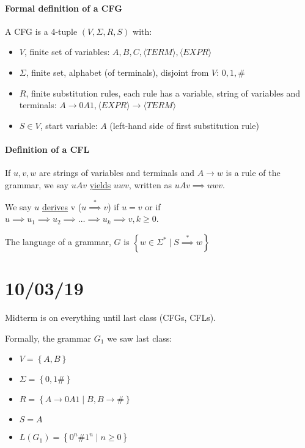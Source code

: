 \documentclass[12 pt]{article}
\begin{document}
\paragraph{Formal definition of a CFG}
A CFG is a 4-tuple $(V, \Sigma, R, S)$ with:
\begin{itemize}
\item $V$, finite set of variables: $A, B, C, \langle TERM \rangle, \langle EXPR
  \rangle$
\item $\Sigma$, finite set, alphabet (of terminals), disjoint from $V$: $0, 1, \#$
\item $R$, finite substitution rules, each rule has a variable, string
  of variables and terminals: $A \to 0A1, \langle EXPR \rangle \to \langle
  TERM \rangle$
\item $S \in V$, start variable: $A$ (left-hand side of first substitution rule)
\end{itemize}
\paragraph{Definition of a CFL}
If $u, v, w$ are strings of variables and terminals and $A \to w$ is a
rule of the grammar, we say $uAv$ \underline{yields} $uwv$, written as
$uAv \implies uwv$.

We say $u$ \underline{derives} v ($u \stackrel{*}{\implies} v$) if $u
= v$ or if $u \implies u_1 \implies u_2 \implies \ldots \implies u_k
\implies v, k \geq 0$.

The language of a grammar, $G$ is $\left\{w \in \Sigma^* \mid S
  \stackrel{*}{\implies}w\right\}$
\section{10/03/19}
Midterm is on everything until last class (CFGs, CFLs).

Formally, the grammar $G_1$ we saw last class:
\begin{itemize}
\item $V = \left\{A, B\right\}$
\item $\Sigma = \left\{0,1\#\right\}$
\item $R = \left\{A \to 0A1 \mid B, B \to \#\right\}$
\item $S = A$
\item $L(G_1) = \left\{0^n \# 1^n \mid n \geq 0\right\}$
\end{itemize}
\end{document}

